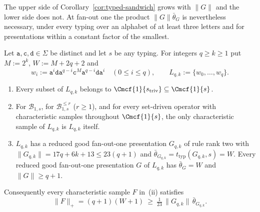
The upper side of Corollary~\ref{cor:typed-sandwich} grows with $\|G\|$ and
the lower side does not.  At fan-out one the product $\|G\|\bar\theta_G$ is
nevertheless necessary, under every typing over an alphabet of at least three
letters and for presentations within a constant factor of the smallest.

\begin{proposition}
\label{prop:linear-factor-sharp}
Let $\mathtt a,\mathtt c,\mathtt d\in\Sigma$ be distinct and let $s$ be any
typing.  For integers $q\ge k\ge1$ put $M:=2^k$, $W:=M+2q+2$ and
\[
 w_i:=\mathtt a^i\mathtt d\mathtt a^{q-i}\mathtt c^M\mathtt a^{q-i}\mathtt d
 \mathtt a^i\quad(0\le i\le q),\qquad L_{q,k}:=\{w_0,\ldots,w_q\}.
\]
\begin{enumerate}[label=\textup{(\roman*)},leftmargin=*]
\item Every subset of $L_{q,k}$ belongs to
$\Cmcf{1}{s_{\mathrm{triv}}}\subseteq\Cmcf{1}{s}$.
\item For $\mathcal B_{1,s}$, for $\mathcal B^{\le r}_{1,s}$ \textup($r\ge1$\textup),
and for every set-driven operator with characteristic samples throughout
$\Cmcf{1}{s}$, the only characteristic sample of $L_{q,k}$ is $L_{q,k}$ itself.
\item $L_{q,k}$ has a reduced good fan-out-one presentation $G_{q,k}$ of rule
rank two with $\|G_{q,k}\|=17q+6k+13\le23(q+1)$ and
$\bar\theta_{G_{q,k}}=t_{\mathrm{typ}}(G_{q,k},s)=W$.  Every reduced good
fan-out-one presentation $G$ of $L_{q,k}$ has $\bar\theta_G=W$ and
$\|G\|\ge q+1$.
\end{enumerate}
Consequently every characteristic sample $F$ in~\textup{(ii)} satisfies
\[
 \|F\|_+=(q+1)(W+1)\ \ge\ \tfrac1{23}\,\|G_{q,k}\|\,\bar\theta_{G_{q,k}}.
\]
\end{proposition}

